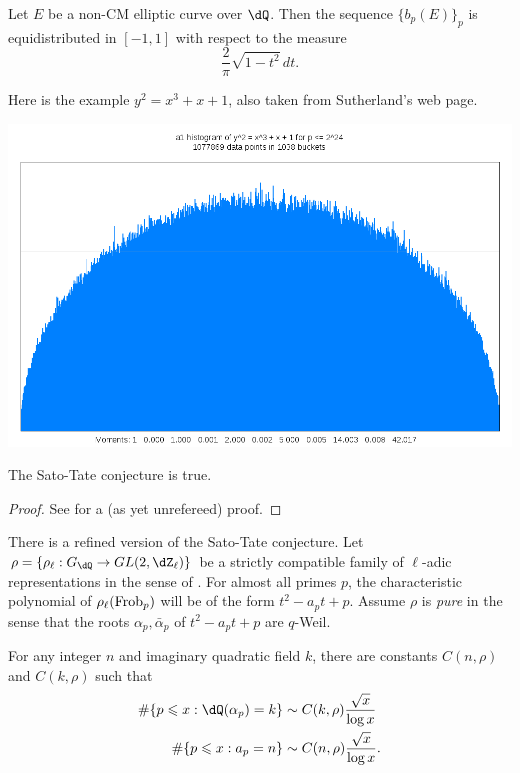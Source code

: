 \begin{conjecture}
Let $E$ be a non-CM elliptic curve over $\dQ$. Then the sequence 
$\{b_p(E)\}_p$ is equidistributed in $[-1,1]$ with respect to the 
measure 
\[
  \frac{2}{\pi} \sqrt{1-t^2}\, dt \text{.}
\]
\end{conjecture}

Here is the example $y^2=x^3+x+1$, also taken from Sutherland's web page. 

\begin{center}
  \includegraphics[scale=.3]{plots/Sato-Tate_nonCM.png}
\end{center}


\begin{theorem}
The Sato-Tate conjecture is true. 
\end{theorem}
\begin{proof}
See \cite[8.3]{bght09} for a (as yet unrefereed) proof. 
\end{proof}

There is a refined version of the Sato-Tate conjecture. Let 
$\rho=\{\rho_\ell:G_\dQ \to GL(2,\dZ_\ell)\}$ be a strictly compatible family 
of $\ell$-adic representations in the sense of \cite[ch.1]{se68}. For almost 
all primes $p$, the characteristic polynomial of $\rho_\ell(\mathrm{Frob}_p)$ will be 
of the form $t^2 - a_p t + p$. Assume $\rho$ is \emph{pure} in the sense that 
the roots $\alpha_p,\bar\alpha_p$ of $t^2-a_p t+p$ are $q$-Weil. 

\begin{conjecture}
For any integer $n$ and imaginary quadratic field $k$, there are constants 
$C(n,\rho)$ and $C(k,\rho)$ such that 
\begin{align*}
  \#\{ p\leqslant x : \dQ(\alpha_p) = k\} &\sim C(k,\rho) \frac{\sqrt x}{\log x} \\
  \#\{p\leqslant x : a_p = n\} &\sim C(n,\rho) \frac{\sqrt x}{\log x} \text{.}
\end{align*}
\end{conjecture}


